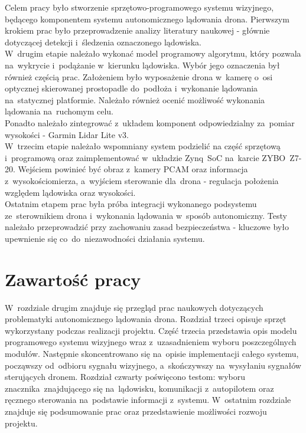 Celem pracy było stworzenie sprzętowo-programowego systemu wizyjnego, będącego komponentem systemu autonomicznego lądowania drona. Pierwszym krokiem prac było przeprowadzenie analizy literatury naukowej - głównie dotyczącej detekcji i~śledzenia oznaczonego lądowiska. \\
W~drugim etapie należało wykonać model programowy algorytmu, który pozwala na~wykrycie i~podążanie w~kierunku lądowiska. Wybór jego oznaczenia był również częścią prac. Założeniem było wyposażenie drona w~kamerę o~osi optycznej skierowanej prostopadle do~podłoża i~wykonanie lądowania na~statycznej platformie. Należało również ocenić możliwość wykonania lądowania na~ruchomym celu.\\
Ponadto należało zintegrować z~układem komponent odpowiedzialny za~pomiar wysokości - Garmin Lidar Lite v3. \\
W~trzecim etapie należało wspomniany system podzielić na część sprzętową i~programową oraz zaimplementować w~układzie Zynq~SoC na~karcie ZYBO~Z7-20. Wejściem powinieć być obraz z~kamery PCAM oraz informacja z~wysokościomierza, a~wyjściem sterowanie dla~drona - regulacja położenia względem lądowiska oraz wysokości.\\
Ostatnim etapem prac była próba integracji wykonanego podsystemu ze~sterownikiem drona i~wykonania lądowania w~sposób autonomiczny. Testy należało przeprowadzić przy zachowaniu zasad bezpieczeństwa - kluczowe było upewnienie się co~do~niezawodności działania systemu.



\section{Zawartość pracy}
\label{sec:zawartoscPracy}
W~rozdziale drugim znajduje się przegląd prac naukowych dotyczących problematyki autonomicznego lądowania drona. Rozdział trzeci opisuje sprzęt wykorzystany podczas realizacji projektu. Część trzecia przedstawia opis modelu programowego systemu wizyjnego wraz z~uzasadnieniem wyboru poszczególnych modułów. Następnie skoncentrowano się na~opisie implementacji całego systemu, począwszy od~odbioru sygnału wizyjnego, a~skończywszy na~wysyłaniu sygnałów sterujących dronem. Rozdział czwarty poświęcono testom: wyboru znacznika~znajdującego się na~lądowisku, komunikacji z~autopilotem oraz ręcznego sterowania na~podstawie informacji z~systemu. W~ostatnim rozdziale znajduje się podsumowanie prac oraz przedstawienie możliwości rozwoju projektu.

